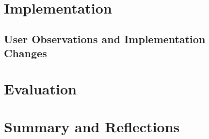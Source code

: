 \documentclass [11pt,a4paper]{article}
\begin{document}
\section{Implementation}
\label{sec:implementation}


\subsection{User Observations and Implementation Changes}
\label{sec:observations}



\section{Evaluation}
\label{sec:evaluation}

\section{Summary and Reflections}
\label{sec:summary}
\end{document}
